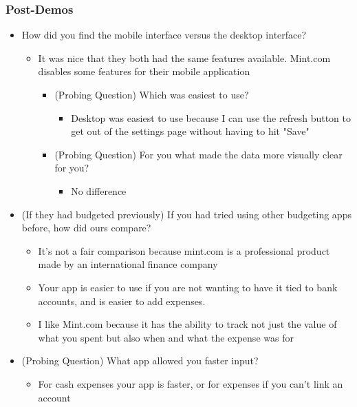 \documentclass{chi2011}
\begin{document}
	\subsubsection{Post-Demos}
	\begin{itemize}[noitemsep]
		\item How did you find the mobile interface versus the desktop interface?
		\begin{itemize}[noitemsep]
			\item It was nice that they both had the same features available. Mint.com disables some
				  features for their mobile application
			\begin{itemize}[noitemsep]
				\item (Probing Question) Which was easiest to use?
				\begin{itemize}[noitemsep]
					\item Desktop was easiest to use because I can use the refresh button to get out of the
						  settings page without having to hit "Save"
				\end{itemize}
			\item (Probing Question) For you what made the data more visually clear for you?
				\begin{itemize}[noitemsep]
					\item No difference
				\end{itemize}
			\end{itemize}
		\end{itemize}	
	\item (If they had budgeted previously) If you had tried using other budgeting apps before, how did ours compare?
		\begin{itemize}[noitemsep]
			\item It's not a fair comparison because mint.com is a professional product made by an 
				  international finance company
			\item Your app is easier to use if you are not wanting to have it tied to bank accounts, and is
				  easier to add expenses.
			\item I like Mint.com because it has the ability to track not just the value of what you spent
				  but also when and what the expense was for
		\end {itemize}
	\item (Probing Question) What app allowed you faster input?
		\begin{itemize}[noitemsep]
			\item For cash expenses your app is faster, or for expenses if you can't link an account

\end{itemize}
\end{itemize}
\end{document}
